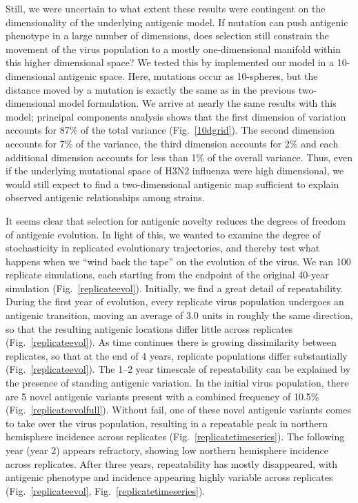 Still, we were uncertain to what extent these results were contingent on the dimensionality of the underlying antigenic model.  If mutation can push antigenic phenotype in a large number of dimensions, does selection still constrain the movement of the virus population to a mostly one-dimensional manifold within this higher dimensional space?  We tested this by implemented our model in a 10-dimensional antigenic space.  Here, mutations occur as 10-spheres, but the distance moved by a mutation is exactly the same as in the previous two-dimensional model formulation.  We arrive at nearly the same results with this model; principal components analysis shows that the first dimension of variation accounts for 87\% of the total variance (Fig.~\ref{10dgrid}).  The second dimension accounts for 7\% of the variance, the third dimension accounts for 2\% and each additional dimension accounts for less than 1\% of the overall variance.  Thus, even if the underlying mutational space of H3N2 influenza were high dimensional, we would still expect to find a two-dimensional antigenic map sufficient to explain observed antigenic relationships among strains.  

It seems clear that selection for antigenic novelty reduces the degrees of freedom of antigenic evolution.  In light of this, we wanted to examine the degree of stochasticity in replicated evolutionary trajectories, and thereby test what happens when we ``wind back the tape'' \cite{GouldWonderfulLife} on the evolution of the virus.  We ran 100 replicate simulations, each starting from the endpoint of the original 40-year simulation (Fig.~\ref{replicateevol}).  Initially, we find a great detail of repeatability.  During the first year of evolution, every replicate virus population undergoes an antigenic transition, moving an average of 3.0 units in roughly the same direction, so that the resulting antigenic locations differ little across replicates (Fig.~\ref{replicateevol}).  As time continues there is growing dissimilarity between replicates, so that at the end of 4 years, replicate populations differ substantially (Fig.~\ref{replicateevol}).  The 1--2 year timescale of repeatability can be explained by the presence of standing antigenic variation.  In the initial virus population, there are 5 novel antigenic variants present with a combined frequency of 10.5\% (Fig.~\ref{replicateevolfull}).  Without fail, one of these novel antigenic variants comes to take over the virus population, resulting in a repeatable peak in northern hemisphere incidence across replicates (Fig.~\ref{replicatetimeseries}).  The following year (year 2) appears refractory, showing low northern hemisphere incidence across replicates.  After three years, repeatability has mostly disappeared, with antigenic phenotype and incidence appearing highly variable across replicates (Fig.~\ref{replicateevol}, Fig.~\ref{replicatetimeseries}).

